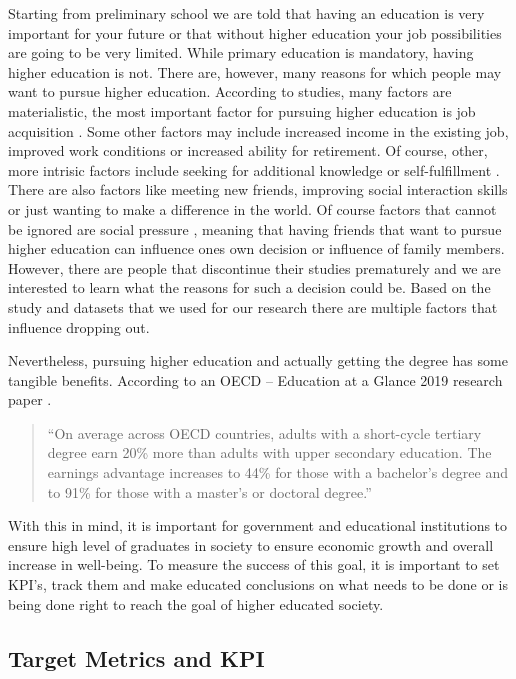 \documentclass[
  letterpaper,
  DIV=11,
  numbers=noendperiod]{scrartcl}
\begin{document}
Starting from preliminary school we are told that having an education is
very important for your future or that without higher education your job
possibilities are going to be very limited. While primary education is
mandatory, having higher education is not. There are, however, many
reasons for which people may want to pursue higher education. According
to studies, many factors are materialistic, the most important factor
for pursuing higher education is job acquisition
\autocite{knutsen_motivation_2011}. Some other factors may include
increased income in the existing job, improved work conditions or
increased ability for retirement. Of course, other, more intrisic
factors include seeking for additional knowledge or self-fulfillment
\autocite{cortes_factors_2023}. There are also factors like meeting new
friends, improving social interaction skills or just wanting to make a
difference in the world. Of course factors that cannot be ignored are
social pressure \autocite{temple_factors_2009}, meaning that having
friends that want to pursue higher education can influence ones own
decision or influence of family members. However, there are people that
discontinue their studies prematurely and we are interested to learn
what the reasons for such a decision could be. Based on the study and
datasets that we used for our research there are multiple factors that
influence dropping out.

Nevertheless, pursuing higher education and actually getting the degree
has some tangible benefits. According to an OECD -- Education at a
Glance 2019 research paper \autocite{oecd_education_2019}.

\begin{quote}
\enquote{On average across OECD countries, adults with a short-cycle
tertiary degree earn 20\% more than adults with upper secondary
education. The earnings advantage increases to 44\% for those with a
bachelor's degree and to 91\% for those with a master's or doctoral
degree.}
\end{quote}

With this in mind, it is important for government and educational
institutions to ensure high level of graduates in society to ensure
economic growth and overall increase in well-being. To measure the
success of this goal, it is important to set KPI's, track them and make
educated conclusions on what needs to be done or is being done right to
reach the goal of higher educated society.

\hypertarget{target-metrics-and-kpi}{%
\subsection{Target Metrics and KPI}\label{target-metrics-and-kpi}}
\end{document}
